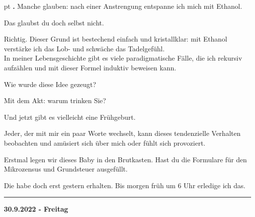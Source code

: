 \documentclass[10pt,a4paper]{article}
\newcounter{notec}
\newcommand\notep[1]{%
  \stepcounter{notec}
  \vskip #1pt
  {\bf\arabic{notec}.}
}
\newcommand\rele[1] {{\color {english} \bf {#1}}}              %
\newcommand\ddivide {\vskip -9pt \hrule \vskip 6pt}
\begin{document}
\begin{mdframed}[style=daystyle]
  \notep 4 Manche glauben: nach einer Anstrengung entspanne ich mich mit
  Ethanol.

  \vskip 2pt
  Das glaubst du doch selbst nicht.

  \vskip 2pt
  Richtig. Dieser Grund ist bestechend einfach und kristallklar: mit Ethanol
  verstärke ich das Lob- und schwäche das Tadelgefühl. \\
  In meiner Lebensgeschichte gibt es viele paradigmatische Fälle, die ich
  rekursiv aufzählen und mit dieser Formel induktiv beweisen kann.

  \vskip 2pt
  Wie wurde diese Idee gezeugt?

  \vskip 2pt
  Mit dem Akt: warum trinken Sie?

  \vskip 2pt
  Und jetzt gibt es vielleicht eine Frühgeburt.

  \vskip 2pt
  Jeder, der mit mir ein paar Worte wechselt, kann dieses tendenzielle Verhalten
  beobachten und amüsiert sich über mich oder fühlt sich provoziert.

  \vskip 2pt
  Erstmal legen wir dieses Baby in den Brutkasten. Hast du die Formulare für den
  Mikrozensus und Grundsteuer ausgefüllt.

  \vskip 2pt
  Die habe doch erst gestern erhalten. Bis morgen früh um 6 Uhr erledige ich das.

\end{mdframed}


\ddivide
{\rele {30.9.2022 - Freitag}}
       
\end{document}
